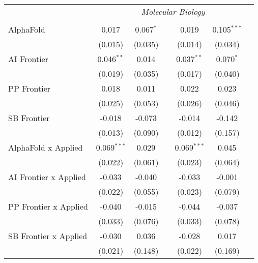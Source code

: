 \begin{tabular}{lcccccc}
 & \multicolumn{6}{c}{\textit{Molecular Biology}} \\ \\
   AlphaFold                      & 0.017         & 0.067$^{*}$ &              & 0.019         & 0.105$^{***}$ &   \\   
                                  & (0.015)       & (0.035)     &              & (0.014)       & (0.034)       &   \\   
   AI Frontier                    & 0.046$^{**}$  & 0.014       &              & 0.037$^{**}$  & 0.070$^{*}$   &   \\   
                                  & (0.019)       & (0.035)     &              & (0.017)       & (0.040)       &   \\   
   PP Frontier                    & 0.018         & 0.011       &              & 0.022         & 0.023         &   \\   
                                  & (0.025)       & (0.053)     &              & (0.026)       & (0.046)       &   \\   
   SB Frontier                    & -0.018        & -0.073      &              & -0.014        & -0.142        &   \\   
                                  & (0.013)       & (0.090)     &              & (0.012)       & (0.157)       &   \\   
   AlphaFold x Applied            & 0.069$^{***}$ & 0.029       &              & 0.069$^{***}$ & 0.045         &   \\   
                                  & (0.022)       & (0.061)     &              & (0.023)       & (0.064)       &   \\   
   AI Frontier x Applied          & -0.033        & -0.040      &              & -0.033        & -0.001        &   \\   
                                  & (0.022)       & (0.055)     &              & (0.023)       & (0.079)       &   \\   
   PP Frontier x Applied          & -0.040        & -0.015      &              & -0.044        & -0.037        &   \\   
                                  & (0.033)       & (0.076)     &              & (0.033)       & (0.078)       &   \\   
   SB Frontier x Applied          & -0.030        & 0.036       &              & -0.028        & 0.017         &   \\   
                                  & (0.021)       & (0.148)     &              & (0.022)       & (0.169)       &   \\   

\end{tabular}
